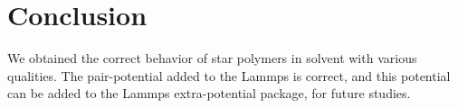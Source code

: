 \section{Conclusion}
We obtained the correct behavior of star polymers in solvent with various qualities. The pair-potential added to the Lammps is correct, and this potential can be added to the Lammps extra-potential package, for future studies.